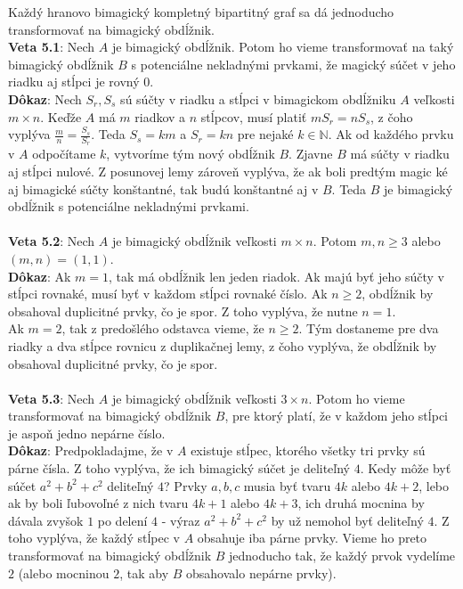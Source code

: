 \documentclass[12pt]{article}
\begin{document}
Každý hranovo bimagický kompletný bipartitný graf sa dá jednoducho transformovať na bimagický obdĺžnik. \\

\textbf{Veta 5.1}: Nech $A$ je bimagický obdĺžnik. Potom ho vieme transformovať na taký bimagický obdĺžnik $B$ s potenciálne nekladnými prvkami, že magický súčet v jeho riadku aj stĺpci je rovný $0$. \\

\textbf{Dôkaz}: Nech $S_r, S_s$ sú súčty v riadku a stĺpci v bimagickom obdĺžniku $A$ veľkosti $m \times n$. Keďže $A$ má $m$ riadkov a $n$ stĺpcov, musí platiť $m S_r = n S_s$, z čoho vyplýva $\frac{m}{n} = \frac{S_s}{S_r}$. Teda $S_s = km$ a $S_r = kn$ pre nejaké $k \in \mathbb{N}$. Ak od každého prvku v $A$ odpočítame $k$, vytvoríme tým nový obdĺžnik $B$. Zjavne $B$ má súčty v riadku aj stĺpci nulové. Z posunovej lemy zároveň vyplýva, že ak boli predtým magic ké aj bimagické súčty konštantné, tak budú konštantné aj v $B$. Teda $B$ je bimagický obdĺžnik s potenciálne nekladnými prvkami. \\\\

\textbf{Veta 5.2}: Nech $A$ je bimagický obdĺžnik veľkosti $m \times n$. Potom $m,n \geq 3$ alebo $(m, n) = (1, 1)$. \\

\textbf{Dôkaz}: Ak $m = 1$, tak má obdĺžnik len jeden riadok. Ak majú byť jeho súčty v stĺpci rovnaké, musí byť v každom stĺpci rovnaké číslo. Ak $n \geq 2$, obdĺžnik by obsahoval duplicitné prvky, čo je spor. Z toho vyplýva, že nutne $n = 1$. \\

Ak $m = 2$, tak z predošlého odstavca vieme, že $n \geq 2$. Tým dostaneme pre dva riadky a dva stĺpce rovnicu z duplikačnej lemy, z čoho vyplýva, že obdĺžnik by obsahoval duplicitné prvky, čo je spor. \\\\

\textbf{Veta 5.3}: Nech $A$ je bimagický obdĺžnik veľkosti $3 \times n$. Potom ho vieme transformovať na bimagický obdĺžnik $B$, pre ktorý platí, že v každom jeho stĺpci je aspoň jedno nepárne číslo. \\

\textbf{Dôkaz}: Predpokladajme, že v $A$ existuje stĺpec, ktorého všetky tri prvky sú párne čísla. Z toho vyplýva, že ich bimagický súčet je deliteľný $4$. Kedy môže byť súčet $a^2 + b^2 + c^2$ deliteľný $4$? Prvky $a,b,c$ musia byť tvaru $4k$ alebo $4k+2$, lebo ak by boli ľubovoľné z nich tvaru $4k+1$ alebo $4k+3$, ich druhá mocnina by dávala zvyšok $1$ po delení $4$ - výraz $a^2 + b^2 + c^2$ by už nemohol byť deliteľný $4$. Z toho vyplýva, že každý stĺpec v $A$ obsahuje iba párne prvky. Vieme ho preto transformovať na bimagický obdĺžnik $B$ jednoducho tak, že každý prvok vydelíme $2$ (alebo mocninou $2$, tak aby $B$ obsahovalo nepárne prvky). \\\\
 
\end{document}
